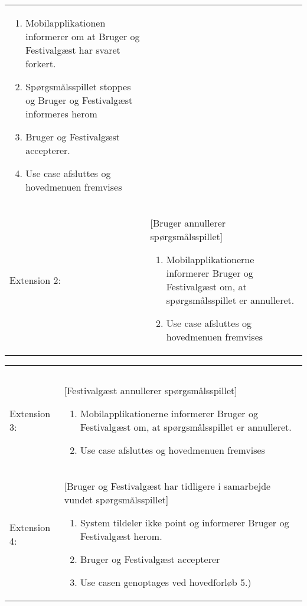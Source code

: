 \begin{tabular}{ >{\raggedleft} p{3cm} | p{12cm} }
\begin{enumerate}[label=\arabic*.),itemjoin={\newline},topsep=0pt,partopsep=0pt,itemsep=0pt,leftmargin=*]
\item Mobilapplikationen informerer om at Bruger og Festivalgæst har svaret forkert.
\item Spørgsmålsspillet stoppes og Bruger og Festivalgæst informeres herom
\item Bruger og Festivalgæst accepterer.
\item Use case afsluttes og hovedmenuen fremvises
\end{enumerate} \\
Extension 2: &  [Bruger annullerer spørgsmålsspillet]
\vspace{2 mm}
\begin{enumerate}[label=\arabic*.),itemjoin={\newline},topsep=0pt,partopsep=0pt,itemsep=0pt,leftmargin=*]   
\item Mobilapplikationerne informerer Bruger og Festivalgæst om, at spørgsmålsspillet er annulleret.
\item Use case afsluttes og hovedmenuen fremvises
\end{enumerate} \\
\end{tabular}

\newpage

\begin{tabular}{ >{\raggedleft} p{3cm} | p{12cm} }
& \\
& \\
Extension 3: &  [Festivalgæst annullerer spørgsmålsspillet]
\vspace{2 mm}
\begin{enumerate}[label=\arabic*.),itemjoin={\newline},topsep=0pt,partopsep=0pt,itemsep=0pt,leftmargin=*]   
\item Mobilapplikationerne informerer Bruger og Festivalgæst om, at spørgsmålsspillet er annulleret.
\item Use case afsluttes og hovedmenuen fremvises
\end{enumerate} \\
Extension 4: & [Bruger og Festivalgæst har tidligere i samarbejde vundet spørgsmålsspillet]
\vspace{2 mm}
\begin{enumerate}[label=\arabic*.),itemjoin={\newline},topsep=0pt,partopsep=0pt,itemsep=0pt,leftmargin=*]   
\item System tildeler ikke point og informerer Bruger og Festivalgæst herom.
\item Bruger og Festivalgæst accepterer
\item Use casen genoptages ved hovedforløb 5.)
\end{enumerate} \\
\end{tabular}

